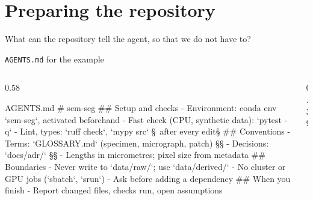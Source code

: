 \section[Repository]{Preparing the repository}
  {What can the repository tell the agent, so that we do not have to?}
  {\faFolderOpen}

\begin{frame}[fragile]{\texttt{AGENTS.md} for the example}
  \begin{columns}[T,onlytextwidth]
    \begin{column}{0.58\textwidth}
\begin{codefile}[basicstyle=\ttfamily\fontsize{7.2}{8.75}\selectfont]{AGENTS.md}
# sem-seg
## Setup and checks
- Environment: conda env `sem-seg`, activated beforehand
- Fast check (CPU, synthetic data): `pytest -q`
- Lint, types: `ruff check`, `mypy src` §\textcolor{udsred}{\sffamily\scriptsize\faArrowLeft\ after every edit}§
## Conventions
- Terms: `GLOSSARY.md` (specimen, micrograph, patch) §\smash{\textcolor{udsblue}{\faLink}}§
- Decisions: `docs/adr/` §\smash{\textcolor{udsblue}{\faLink}}§
- Lengths in micrometres; pixel size from metadata
## Boundaries
- Never write to `data/raw/`; use `data/derived/`
- No cluster or GPU jobs (`sbatch`, `srun`)
- Ask before adding a dependency
## When you finish
- Report changed files, checks run, open assumptions
\end{codefile}
    \end{column}
    \begin{column}{0.39\textwidth}
\end{column}
\end{columns}
\end{frame}
